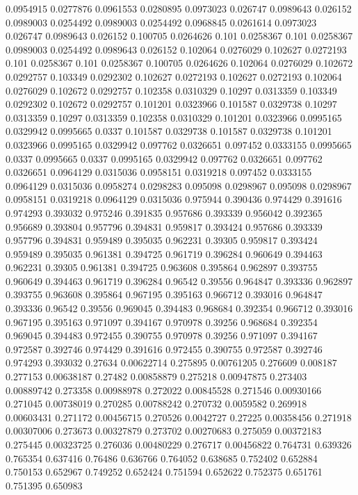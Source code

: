 0.0954915 0.0277876
0.0961553 0.0280895
0.0973023 0.026747
0.0989643 0.026152
0.0989003 0.0254492
0.0989003 0.0254492
0.0968845 0.0261614
0.0973023 0.026747
0.0989643 0.026152
0.100705 0.0264626
0.101 0.0258367
0.101 0.0258367
0.0989003 0.0254492
0.0989643 0.026152
0.102064 0.0276029
0.102627 0.0272193
0.101 0.0258367
0.101 0.0258367
0.100705 0.0264626
0.102064 0.0276029
0.102672 0.0292757
0.103349 0.0292302
0.102627 0.0272193
0.102627 0.0272193
0.102064 0.0276029
0.102672 0.0292757
0.102358 0.0310329
0.10297 0.0313359
0.103349 0.0292302
0.102672 0.0292757
0.101201 0.0323966
0.101587 0.0329738
0.10297 0.0313359
0.10297 0.0313359
0.102358 0.0310329
0.101201 0.0323966
0.0995165 0.0329942
0.0995665 0.0337
0.101587 0.0329738
0.101587 0.0329738
0.101201 0.0323966
0.0995165 0.0329942
0.097762 0.0326651
0.097452 0.0333155
0.0995665 0.0337
0.0995665 0.0337
0.0995165 0.0329942
0.097762 0.0326651
0.097762 0.0326651
0.0964129 0.0315036
0.0958151 0.0319218
0.097452 0.0333155
0.0964129 0.0315036
0.0958274 0.0298283
0.095098 0.0298967
0.095098 0.0298967
0.0958151 0.0319218
0.0964129 0.0315036
0.975944 0.390436
0.974429 0.391616
0.974293 0.393032
0.975246 0.391835
0.957686 0.393339
0.956042 0.392365
0.956689 0.393804
0.957796 0.394831
0.959817 0.393424
0.957686 0.393339
0.957796 0.394831
0.959489 0.395035
0.962231 0.39305
0.959817 0.393424
0.959489 0.395035
0.961381 0.394725
0.961719 0.396284
0.960649 0.394463
0.962231 0.39305
0.961381 0.394725
0.963608 0.395864
0.962897 0.393755
0.960649 0.394463
0.961719 0.396284
0.96542 0.39556
0.964847 0.393336
0.962897 0.393755
0.963608 0.395864
0.967195 0.395163
0.966712 0.393016
0.964847 0.393336
0.96542 0.39556
0.969045 0.394483
0.968684 0.392354
0.966712 0.393016
0.967195 0.395163
0.971097 0.394167
0.970978 0.39256
0.968684 0.392354
0.969045 0.394483
0.972455 0.390755
0.970978 0.39256
0.971097 0.394167
0.972587 0.392746
0.974429 0.391616
0.972455 0.390755
0.972587 0.392746
0.974293 0.393032
0.27634 0.00622714
0.275895 0.00761205
0.276609 0.008187
0.277153 0.00638187
0.27482 0.00858879
0.275218 0.00947875
0.273403 0.00889742
0.273358 0.00988978
0.272022 0.00845528
0.271546 0.00930166
0.271045 0.00738019
0.270285 0.00788242
0.270732 0.0059582
0.269918 0.00603431
0.271172 0.00456715
0.270526 0.0042727
0.27225 0.00358456
0.271918 0.00307006
0.273673 0.00327879
0.273702 0.00270683
0.275059 0.00372183
0.275445 0.00323725
0.276036 0.00480229
0.276717 0.00456822
0.764731 0.639326
0.765354 0.637416
0.76486 0.636766
0.764052 0.638685
0.752402 0.652884
0.750153 0.652967
0.749252 0.652424
0.751594 0.652622
0.752375 0.651761
0.751395 0.650983
